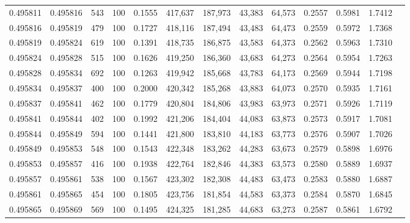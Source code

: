 \begin{tabular}{rrrrrrrrrrrrr}
0.495811 & 0.495816 &   543 & 100 &                                     0.1555 & 417,637 & 187,973 &  43,383 &  64,573 & 0.2557 & 0.5981 & 1.7412 \\
0.495816 & 0.495819 &   479 & 100 &                                     0.1727 & 418,116 & 187,494 &  43,483 &  64,473 & 0.2559 & 0.5972 & 1.7368 \\
0.495819 & 0.495824 &   619 & 100 &                                     0.1391 & 418,735 & 186,875 &  43,583 &  64,373 & 0.2562 & 0.5963 & 1.7310 \\
0.495824 & 0.495828 &   515 & 100 &                                     0.1626 & 419,250 & 186,360 &  43,683 &  64,273 & 0.2564 & 0.5954 & 1.7263 \\
0.495828 & 0.495834 &   692 & 100 &                                     0.1263 & 419,942 & 185,668 &  43,783 &  64,173 & 0.2569 & 0.5944 & 1.7198 \\
0.495834 & 0.495837 &   400 & 100 &                                     0.2000 & 420,342 & 185,268 &  43,883 &  64,073 & 0.2570 & 0.5935 & 1.7161 \\
0.495837 & 0.495841 &   462 & 100 &                                     0.1779 & 420,804 & 184,806 &  43,983 &  63,973 & 0.2571 & 0.5926 & 1.7119 \\
0.495841 & 0.495844 &   402 & 100 &                                     0.1992 & 421,206 & 184,404 &  44,083 &  63,873 & 0.2573 & 0.5917 & 1.7081 \\
0.495844 & 0.495849 &   594 & 100 &                                     0.1441 & 421,800 & 183,810 &  44,183 &  63,773 & 0.2576 & 0.5907 & 1.7026 \\
0.495849 & 0.495853 &   548 & 100 &                                     0.1543 & 422,348 & 183,262 &  44,283 &  63,673 & 0.2579 & 0.5898 & 1.6976 \\
0.495853 & 0.495857 &   416 & 100 &                                     0.1938 & 422,764 & 182,846 &  44,383 &  63,573 & 0.2580 & 0.5889 & 1.6937 \\
0.495857 & 0.495861 &   538 & 100 &                                     0.1567 & 423,302 & 182,308 &  44,483 &  63,473 & 0.2583 & 0.5880 & 1.6887 \\
0.495861 & 0.495865 &   454 & 100 &                                     0.1805 & 423,756 & 181,854 &  44,583 &  63,373 & 0.2584 & 0.5870 & 1.6845 \\
0.495865 & 0.495869 &   569 & 100 &                                     0.1495 & 424,325 & 181,285 &  44,683 &  63,273 & 0.2587 & 0.5861 & 1.6792 \\

\end{tabular}
